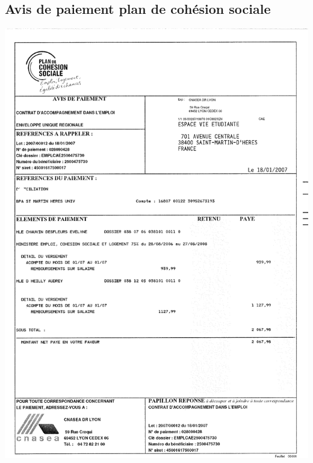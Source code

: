 \subsection{Avis de paiement plan de cohésion sociale}
\begin{center}
\includegraphics[scale=0.8]{annexes/images/bonne_question.pdf}
\end{center}
